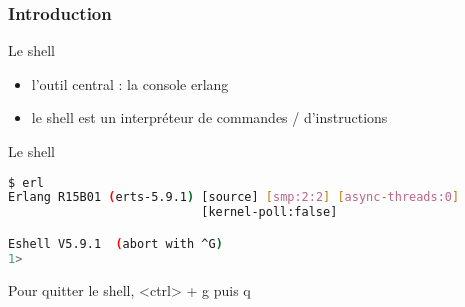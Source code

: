 \begin{frame}[fragile]
  \frametitle{Introduction}

  \begin{block}{Le shell}
    \begin{itemize}
      \item l'outil central : la console erlang
      \item le shell est un interpréteur de commandes / d'instructions
    \end{itemize}
  \end{block}

  \begin{exampleblock}{Le shell}
    \begin{lstlisting}[language=bash]
$ erl
Erlang R15B01 (erts-5.9.1) [source] [smp:2:2] [async-threads:0]
                           [kernel-poll:false]

Eshell V5.9.1  (abort with ^G)
1>
    \end{lstlisting}
  \end{exampleblock}

  \begin{alertblock}{}
    Pour quitter le shell, <ctrl> + g puis q
  \end{alertblock}

\end{frame}
